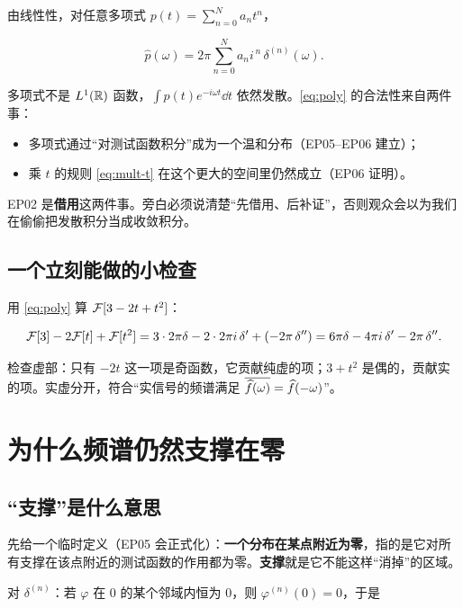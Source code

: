 由线性性，对任意多项式 $p(t)=\sum_{n=0}^{N}a_n t^{n}$，

\begin{equation}
\widehat{p}(\omega)=2\pi\sum_{n=0}^{N}a_n i^{\,n}\,\delta^{(n)}(\omega).\label{eq:poly}
\end{equation}

\begin{warnbox}
多项式不是 $L^1(\mathbb{R})$ 函数，$\int p(t)e^{-i\omega t}\dd t$ 依然发散。\eqref{eq:poly} 的合法性来自两件事：
\begin{itemize}[leftmargin=1.4em,itemsep=0.2em]
\item 多项式通过“对测试函数积分”成为一个温和分布（EP05--EP06 建立）；
\item 乘 $t$ 的规则 \eqref{eq:mult-t} 在这个更大的空间里仍然成立（EP06 证明）。
\end{itemize}
EP02 是\textbf{借用}这两件事。旁白必须说清楚“先借用、后补证”，否则观众会以为我们在偷偷把发散积分当成收敛积分。
\end{warnbox}

\subsection{一个立刻能做的小检查}

用 \eqref{eq:poly} 算 $\mathcal{F}[3-2t+t^{2}]$：

\begin{equation}
\mathcal{F}[3]-2\mathcal{F}[t]+\mathcal{F}[t^{2}]
=3\cdot2\pi\delta-2\cdot2\pi i\,\delta'+(-2\pi\,\delta'')
=6\pi\delta-4\pi i\,\delta'-2\pi\,\delta'' .
\end{equation}

检查虚部：只有 $-2t$ 这一项是奇函数，它贡献纯虚的项；$3+t^{2}$ 是偶的，贡献实的项。实虚分开，符合“实信号的频谱满足 $\overline{\widehat{f}(\omega)}=\widehat{f}(-\omega)$”。

\section{为什么频谱仍然支撑在零}

\subsection{“支撑”是什么意思}

先给一个临时定义（EP05 会正式化）：\textbf{一个分布在某点附近为零}，指的是它对所有支撑在该点附近的测试函数的作用都为零。\textbf{支撑}就是它不能这样“消掉”的区域。

对 $\delta^{(n)}$：若 $\varphi$ 在 $0$ 的某个邻域内恒为 $0$，则 $\varphi^{(n)}(0)=0$，于是

